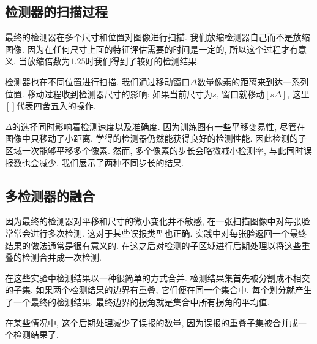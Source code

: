 \documentclass[a4paper,utf8,11pt, onecolumn]{ctexart}
\begin{document}
\subsection{检测器的扫描过程}
最终的检测器在多个尺寸和位置对图像进行扫描. 我们放缩检测器自己而不是放缩图像. 因为在任何尺寸上面的特征评估需要的时间是一定的, 所以这个过程才有意义. 当放缩倍数为$1.25$时我们得到了较好的检测结果.

检测器也在不同位置进行扫描. 我们通过移动窗口$\Delta$数量像素的距离来到达一系列位置. 移动过程收到检测器尺寸的影响: 如果当前尺寸为$s$, 窗口就移动$[s\Delta]$, 这里$[]$代表四舍五入的操作.

$\Delta$的选择同时影响着检测速度以及准确度. 因为训练图有一些平移变易性, 尽管在图像中只移动了小距离, 学得的检测器仍然能获得良好的检测性能. 因此检测的子区域一次能够平移多个像素.
然而, 多个像素的步长会略微减小检测率, 与此同时误报数也会减少. 我们展示了两种不同步长的结果.

\subsection{多检测器的融合}
因为最终的检测器对平移和尺寸的微小变化并不敏感, 在一张扫描图像中对每张脸常常会进行多次检测. 这对于某些误报类型也正确. 实践中对每张脸返回一个最终结果的做法通常是很有意义的. 在这之后对检测的子区域进行后期处理以将这些重叠的检测合并成一次检测.

在这些实验中检测结果以一种很简单的方式合并. 检测结果集首先被分割成不相交的子集. 如果两个检测结果的边界有重叠, 它们便在同一个集合中. 每个划分就产生了一个最终的检测结果. 最终边界的拐角就是集合中所有拐角的平均值.

在某些情况中, 这个后期处理减少了误报的数量, 因为误报的重叠子集被合并成一个检测结果了.
\end{document}
